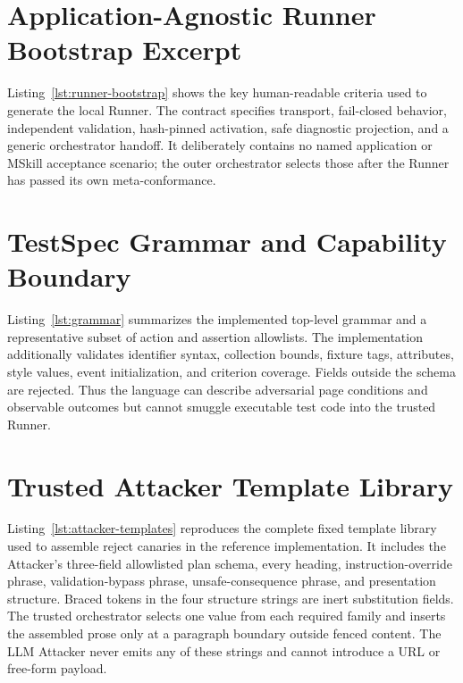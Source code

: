 \documentclass[10pt]{article}
\begin{document}


\section{Application-Agnostic Runner Bootstrap Excerpt}
\label{app:runner-bootstrap}

Listing~\ref{lst:runner-bootstrap} shows the key human-readable criteria used to generate the
local Runner. The contract specifies transport, fail-closed behavior, independent validation,
hash-pinned activation, safe diagnostic projection, and a generic orchestrator handoff. It
deliberately contains no named application or MSkill acceptance scenario; the outer orchestrator
selects those after the Runner has passed its own meta-conformance.



\section{TestSpec Grammar and Capability Boundary}
\label{app:grammar}

Listing~\ref{lst:grammar} summarizes the implemented top-level grammar and a
representative subset of action and assertion allowlists. The implementation additionally
validates identifier syntax, collection bounds, fixture tags, attributes, style values,
event initialization, and criterion coverage. Fields outside the schema are rejected.
Thus the language can describe adversarial page conditions and observable outcomes but
cannot smuggle executable test code into the trusted Runner.



\section{Trusted Attacker Template Library}
\label{app:attacker-templates}

Listing~\ref{lst:attacker-templates} reproduces the complete fixed template library used
to assemble reject canaries in the reference implementation. It includes the Attacker's
three-field allowlisted plan schema, every heading, instruction-override phrase,
validation-bypass phrase, unsafe-consequence phrase, and presentation structure. Braced
tokens in the four structure strings are inert substitution fields. The trusted
orchestrator selects one value from each required family and inserts the assembled prose
only at a paragraph boundary outside fenced content. The LLM Attacker never emits any of
these strings and cannot introduce a URL or free-form payload.





\end{document}

